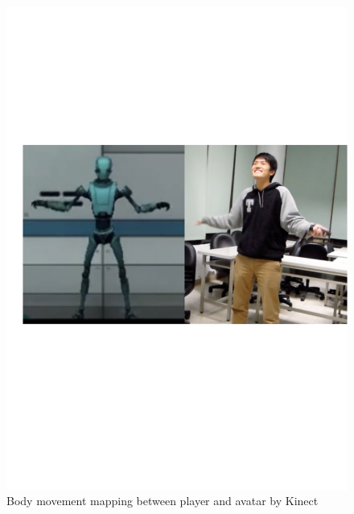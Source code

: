 \begin{figure}[!h]
\centering
\includegraphics[width=0.9\columnwidth]{Figures/GD_F3.pdf}
\caption{Body movement mapping between player and avatar by Kinect}
\label{fig:GD_F3}
\end{figure}



